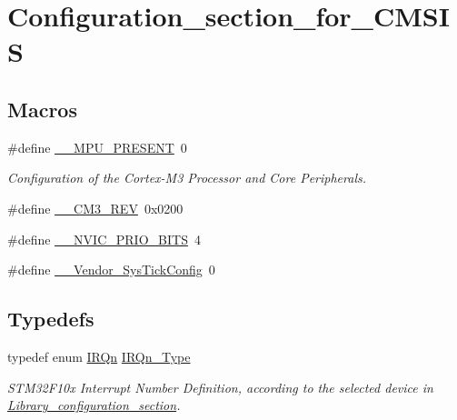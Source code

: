 \hypertarget{group___configuration__section__for___c_m_s_i_s}{}\section{Configuration\+\_\+section\+\_\+for\+\_\+\+C\+M\+S\+IS}
\label{group___configuration__section__for___c_m_s_i_s}
\subsection*{Macros}
\begin{DoxyCompactItemize}
\item 
\#define \mbox{\hyperlink{group___configuration__section__for___c_m_s_i_s_ga4127d1b31aaf336fab3d7329d117f448}{\+\_\+\+\_\+\+M\+P\+U\+\_\+\+P\+R\+E\+S\+E\+NT}}~0
\begin{DoxyCompactList}\small\item\em Configuration of the Cortex-\/\+M3 Processor and Core Peripherals. \end{DoxyCompactList}\item 
\#define \mbox{\hyperlink{group___configuration__section__for___c_m_s_i_s_gac6a3f185c4640e06443c18b3c8d93f53}{\+\_\+\+\_\+\+C\+M3\+\_\+\+R\+EV}}~0x0200
\item 
\#define \mbox{\hyperlink{group___configuration__section__for___c_m_s_i_s_gae3fe3587d5100c787e02102ce3944460}{\+\_\+\+\_\+\+N\+V\+I\+C\+\_\+\+P\+R\+I\+O\+\_\+\+B\+I\+TS}}~4
\item 
\#define \mbox{\hyperlink{group___configuration__section__for___c_m_s_i_s_gab58771b4ec03f9bdddc84770f7c95c68}{\+\_\+\+\_\+\+Vendor\+\_\+\+Sys\+Tick\+Config}}~0
\end{DoxyCompactItemize}
\subsection*{Typedefs}
\begin{DoxyCompactItemize}
\item 
typedef enum \mbox{\hyperlink{group___configuration__section__for___c_m_s_i_s_ga666eb0caeb12ec0e281415592ae89083}{I\+R\+Qn}} \mbox{\hyperlink{group___configuration__section__for___c_m_s_i_s_gac3af4a32370fb28c4ade8bf2add80251}{I\+R\+Qn\+\_\+\+Type}}
\begin{DoxyCompactList}\small\item\em S\+T\+M32\+F10x Interrupt Number Definition, according to the selected device in \mbox{\hyperlink{group___library__configuration__section}{Library\+\_\+configuration\+\_\+section}}. \end{DoxyCompactList}\end{DoxyCompactItemize}
